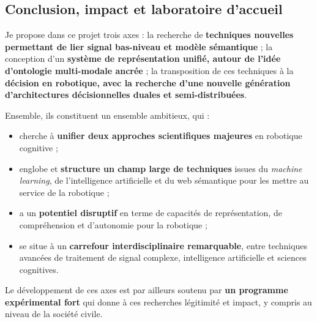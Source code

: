 \documentclass[a4paper]{article}
\begin{document}
\subsection*{Conclusion, impact et laboratoire d'accueil}

Je propose dans ce projet trois axes : la recherche de
\textbf{techniques nouvelles permettant de lier signal bas-niveau et modèle
sémantique} ; la conception d'un \textbf{système de représentation unifié,
autour de l'idée d'ontologie multi-modale ancrée} ; la transposition de ces
techniques à la \textbf{décision en robotique, avec la recherche d'une nouvelle
génération d'architectures décisionnelles duales et semi-distribuées}.

Ensemble, ils constituent un ensemble ambitieux, qui :
\begin{itemize}
    \item cherche à \textbf{unifier deux approches scientifiques majeures} en robotique
        cognitive ;
    \item englobe et \textbf{structure un champ large de techniques} issues du \emph{machine
        learning}, de l'intelligence artificielle et du web sémantique pour
        les mettre au service de la robotique ;
    \item a un \textbf{potentiel disruptif} en terme de capacités de représentation, de
        compréhension et d'autonomie pour la robotique ;
    \item se situe à un \textbf{carrefour interdisciplinaire remarquable}, entre
        techniques avancées de traitement de signal complexe, intelligence
        artificielle et sciences cognitives.
\end{itemize}

Le développement de ces axes est par ailleurs soutenu par \textbf{un programme
expérimental fort} qui donne à ces recherches légitimité et impact, y compris au
niveau de la société civile.
\end{document}
